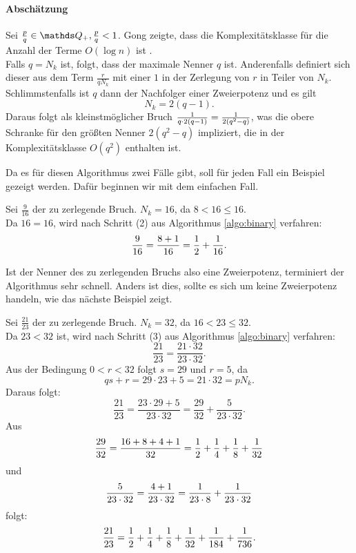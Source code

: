 \paragraph{Abschätzung}Sei $\frac{p}{q} \in \Q_+, \frac{p}{q} < 1$. Gong zeigte, dass die Komplexitätsklasse für die Anzahl der Terme $O(\log n)$ ist \cite[S. 12]{Gong1992}. \\
Falls $q = N_k$ ist, folgt, dass der maximale Nenner $q$ ist. Anderenfalls definiert sich dieser aus dem Term $\frac{r}{qN_k}$ mit einer $1$ in der Zerlegung von $r$ in Teiler von $N_k$. Schlimmstenfalls ist $q$ dann der Nachfolger einer Zweierpotenz und es gilt 
$$N_k = 2(q-1).$$
Daraus folgt als kleinstmöglicher Bruch $\frac{1}{q \cdot 2(q-1)} = \frac{1}{2(q^2-q)}$, was die obere Schranke für den größten Nenner $2(q^2-q)$ impliziert, die in der Komplexitätsklasse $O(q^2)$ enthalten ist.

Da es für diesen Algorithmus zwei Fälle gibt, soll für jeden Fall ein Beispiel gezeigt werden. Dafür beginnen wir mit dem einfachen Fall.

\begin{bsp}
	Sei $\frac{9}{16}$ der zu zerlegende Bruch. $N_k = 16$, da $8<16\leq16$.\\
	Da $16 = 16$, wird nach Schritt (2) aus Algorithmus \ref{algo:binary} verfahren:
	$$\frac{9}{16} = \frac{8+1}{16} = \frac{1}{2}+\frac{1}{16}.$$
\end{bsp}
Ist der Nenner des zu zerlegenden Bruchs also eine Zweierpotenz, terminiert der Algorithmus sehr schnell. Anders ist dies, sollte es sich um keine Zweierpotenz handeln, wie das nächste Beispiel zeigt.
\begin{bsp}
	Sei $\frac{21}{23}$ der zu zerlegende Bruch. $N_k = 32$, da $16 < 23 \leq 32$.\\
	Da $23<32$ ist, wird nach Schritt (3) aus Algorithmus \ref{algo:binary} verfahren:
	$$\frac{21}{23} = \frac{21 \cdot 32}{23 \cdot 32}.$$
	Aus der Bedingung $0<r<32$ folgt $s = 29$ und $r = 5$, da $$qs+r = 29 \cdot 23 + 5 = 21 \cdot 32 = p N_k.$$
	Daraus folgt:
	$$\frac{21}{23} = \frac{23 \cdot 29+5}{23 \cdot 32} = \frac{29}{32} + \frac{5}{23 \cdot 32}.$$
	Aus $$\frac{29}{32} = \frac{16+8+4+1}{32} = \frac{1}{2} + \frac{1}{4} + \frac{1}{8} + \frac{1}{32}$$ und $$\frac{5}{23 \cdot 32} = \frac{4+1}{23 \cdot 32} = \frac{1}{23 \cdot 8} + \frac{1}{23 \cdot 32}$$ folgt:
	$$\frac{21}{23} = \frac{1}{2} + \frac{1}{4} + \frac{1}{8} + \frac{1}{32} + \frac{1}{184} + \frac{1}{736}.$$
\end{bsp}